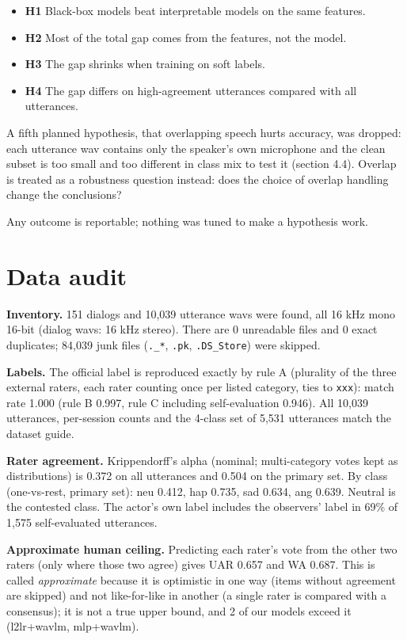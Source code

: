 \documentclass[11pt]{article}
\providecommand{\tightlist}{\setlength{\itemsep}{0pt}\setlength{\parskip}{0pt}}
\begin{document}
\begin{itemize}
\tightlist
\item
  \textbf{H1} Black-box models beat interpretable models on the same features.
\item
  \textbf{H2} Most of the total gap comes from the features, not the model.
\item
  \textbf{H3} The gap shrinks when training on soft labels.
\item
  \textbf{H4} The gap differs on high-agreement utterances compared with all utterances.
\end{itemize}

A fifth planned hypothesis, that overlapping speech hurts accuracy, was dropped: each utterance wav contains only the speaker's own microphone and the clean subset is too small and too different in class mix to test it (section 4.4). Overlap is treated as a robustness question instead: does the choice of overlap handling change the conclusions?

Any outcome is reportable; nothing was tuned to make a hypothesis work.

\section{Data audit}\label{data-audit}

\textbf{Inventory.} 151 dialogs and 10,039 utterance wavs were found, all 16 kHz mono 16-bit (dialog wavs: 16 kHz stereo). There are 0 unreadable files and 0 exact duplicates; 84,039 junk files (\texttt{.\_*}, \texttt{.pk}, \texttt{.DS\_Store}) were skipped.

\textbf{Labels.} The official label is reproduced exactly by rule A (plurality of the three external raters, each rater counting once per listed category, ties to \texttt{xxx}): match rate 1.000 (rule B 0.997, rule C including self-evaluation 0.946). All 10,039 utterances, per-session counts and the 4-class set of 5,531 utterances match the dataset guide.

\textbf{Rater agreement.} Krippendorff's alpha (nominal; multi-category votes kept as distributions) is 0.372 on all utterances and 0.504 on the primary set. By class (one-vs-rest, primary set): neu 0.412, hap 0.735, sad 0.634, ang 0.639. Neutral is the contested class. The actor's own label includes the observers' label in 69\% of 1,575 self-evaluated utterances.

\textbf{Approximate human ceiling.} Predicting each rater's vote from the other two raters (only where those two agree) gives UAR 0.657 and WA 0.687. This is called \emph{approximate} because it is optimistic in one way (items without agreement are skipped) and not like-for-like in another (a single rater is compared with a consensus); it is not a true upper bound, and 2 of our models exceed it (l2lr+wavlm, mlp+wavlm).
\end{document}
